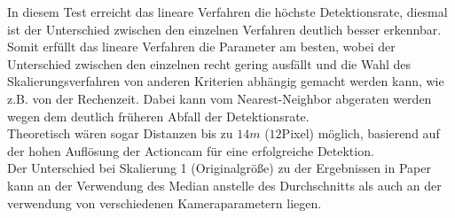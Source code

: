 \newpage
In diesem Test erreicht das lineare Verfahren die höchste Detektionsrate, diesmal ist der Unterschied zwischen den einzelnen Verfahren deutlich besser erkennbar.\\
Somit erfüllt das lineare Verfahren die Parameter am besten, wobei der Unterschied zwischen den einzelnen recht gering ausfällt und die Wahl des Skalierungsverfahren von anderen Kriterien abhängig gemacht werden kann, wie z.B. von der Rechenzeit. Dabei kann vom Nearest-Neighbor abgeraten werden wegen dem deutlich früheren Abfall der Detektionsrate.\\
Theoretisch wären sogar Distanzen bis zu $14m$ ($12$Pixel) möglich, basierend auf der hohen Auflösung der Actioncam für eine erfolgreiche Detektion.\\
Der Unterschied bei Skalierung 1 (Originalgröße) zu der Ergebnissen in Paper \cite{OpenFace} kann an der Verwendung des Median anstelle des Durchschnitts als auch an der verwendung von verschiedenen Kameraparametern liegen.